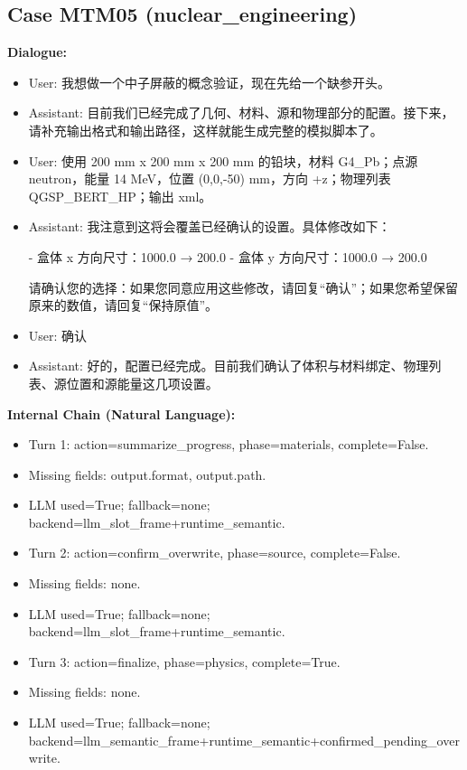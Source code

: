 \documentclass[11pt]{ctexart}
\begin{document}
\subsection{Case MTM05 (nuclear\_engineering)}
\textbf{Dialogue:}
\begin{itemize}
\item User: 我想做一个中子屏蔽的概念验证，现在先给一个缺参开头。
\item Assistant: 目前我们已经完成了几何、材料、源和物理部分的配置。接下来，请补充输出格式和输出路径，这样就能生成完整的模拟脚本了。
\item User: 使用 200 mm x 200 mm x 200 mm 的铅块，材料 G4\_Pb；点源 neutron，能量 14 MeV，位置 (0,0,-50) mm，方向 +z；物理列表 QGSP\_BERT\_HP；输出 xml。
\item Assistant: 我注意到这将会覆盖已经确认的设置。具体修改如下：

- 盒体 x 方向尺寸：1000.0 → 200.0
- 盒体 y 方向尺寸：1000.0 → 200.0

请确认您的选择：如果您同意应用这些修改，请回复“确认”；如果您希望保留原来的数值，请回复“保持原值”。
\item User: 确认
\item Assistant: 好的，配置已经完成。目前我们确认了体积与材料绑定、物理列表、源位置和源能量这几项设置。
\end{itemize}
\textbf{Internal Chain (Natural Language):}
\begin{itemize}
\item Turn 1: action=summarize\_progress, phase=materials, complete=False.
\item Missing fields: output.format, output.path.
\item LLM used=True; fallback=none; backend=llm\_slot\_frame+runtime\_semantic.
\item Turn 2: action=confirm\_overwrite, phase=source, complete=False.
\item Missing fields: none.
\item LLM used=True; fallback=none; backend=llm\_slot\_frame+runtime\_semantic.
\item Turn 3: action=finalize, phase=physics, complete=True.
\item Missing fields: none.
\item LLM used=True; fallback=none; backend=llm\_semantic\_frame+runtime\_semantic+confirmed\_pending\_overwrite.
\end{itemize}
\end{document}
